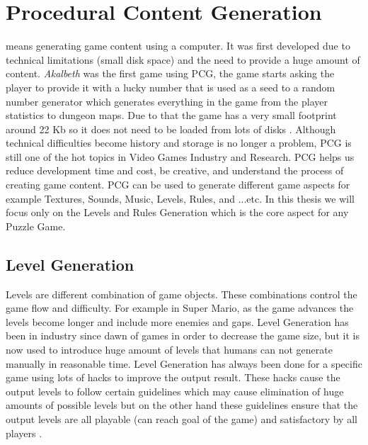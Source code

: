 \section{Procedural Content Generation}
 means generating game content using a computer. It was first developed due to technical limitations (small disk space) and the need to provide a huge amount of content. \emph{Akalbeth} was the first game using PCG, the game starts asking the player to provide it with a lucky number that is used as a seed to a random number generator which generates everything in the game from the player statistics to dungeon maps. Due to that the game has a very small footprint around 22 Kb so it does not need to be loaded from lots of disks \cite{pcgFirstGame}. Although technical difficulties become history and storage is no longer a problem, PCG is still one of the hot topics in Video Games Industry and Research. PCG helps us reduce development time and cost, be creative, and understand the process of creating game content. PCG can be used to generate different game aspects for example Textures, Sounds, Music, Levels, Rules, and ...etc. In this thesis we will focus only on the Levels and Rules Generation which is the core aspect for any Puzzle Game.
\subsection{Level Generation}
Levels are different combination of game objects. These combinations control the game flow and difficulty. For example in Super Mario, as the game advances the levels become longer and include more enemies and gaps. Level Generation has been in industry since dawn of games in order to decrease the game size, but it is now used to introduce huge amount of levels that humans can not generate manually in reasonable time. Level Generation has always been done for a specific game using lots of hacks to improve the output result. These hacks cause the output levels to follow certain guidelines which may cause elimination of huge amounts of possible levels but on the other hand these guidelines ensure that the output levels are all playable (can reach goal of the game) and satisfactory by all players \cite{mcGenerateEverything}.
